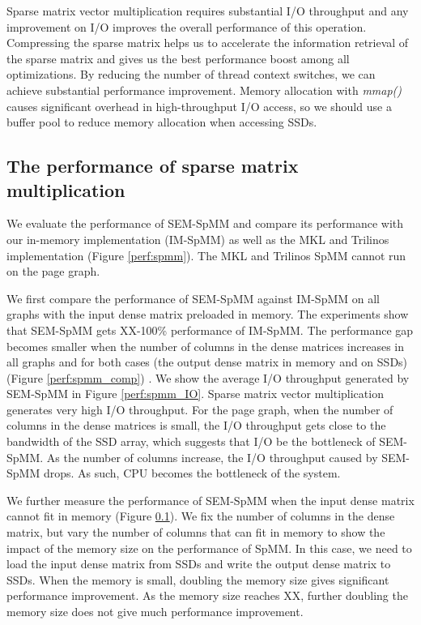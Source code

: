 Sparse matrix vector multiplication requires substantial I/O throughput and
any improvement on I/O improves the overall performance of this operation.
Compressing the sparse matrix helps us to accelerate the information retrieval
of the sparse matrix and gives us the best performance boost among all
optimizations. By reducing the number of thread context switches, we can
achieve substantial performance improvement. Memory allocation with
\textit{mmap()} causes significant overhead in high-throughput I/O access,
so we should use a buffer pool to reduce memory allocation when accessing SSDs.

\subsection{The performance of sparse matrix multiplication}

We evaluate the performance of SEM-SpMM and compare its performance with
our in-memory implementation (IM-SpMM) as well as the MKL and Trilinos
implementation (Figure \ref{perf:spmm}). The MKL and Trilinos SpMM cannot run
on the page graph.

We first compare the performance of SEM-SpMM against IM-SpMM on all graphs with
the input dense matrix preloaded in memory. The experiments show that
SEM-SpMM gets XX-100\% performance of IM-SpMM. The performance gap becomes
smaller when the number of columns in the dense matrices increases in all graphs
and for both cases (the output dense matrix in memory and on SSDs) (Figure
\ref{perf:spmm_comp}) .
We show the average I/O throughput generated by SEM-SpMM in
Figure \ref{perf:spmm_IO}. Sparse matrix vector multiplication generates very high I/O
throughput. For the page graph, when the number of columns in the dense matrices
is small, the I/O throughput gets close to the bandwidth of the SSD array, which
suggests that I/O be the bottleneck of SEM-SpMM. As the number of columns increase,
the I/O throughput
caused by SEM-SpMM drops. As such, CPU becomes the bottleneck of the system.

We further measure the performance of SEM-SpMM when the input dense matrix
cannot fit in memory (Figure \ref{}). We fix the number of columns in the dense
matrix, but vary the number of columns that can fit in memory to show
the impact of the memory size on the performance of SpMM. In this case, we need
to load the input dense matrix from SSDs and write the output dense matrix to
SSDs. When the memory
is small, doubling the memory size gives significant performance improvement.
As the memory size reaches XX, further doubling the memory size does not
give much performance improvement.

